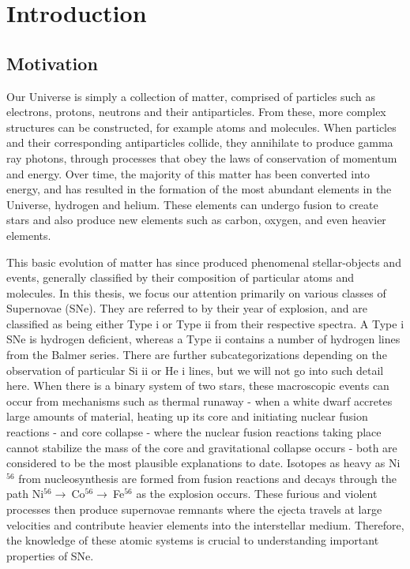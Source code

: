 
\chapter{Introduction} %

\label{cha:intro} %



\section{Motivation}\label{sec:int_motivation}
Our Universe is simply a collection of matter, comprised of particles such as electrons, protons, neutrons and their antiparticles. From these, more complex structures can be constructed, for example atoms and molecules. When particles and their corresponding antiparticles collide, they annihilate to produce gamma ray photons, through processes that obey the laws of conservation of momentum and energy. Over time, the majority of this matter has been converted into energy, and has resulted in the formation of the most abundant elements in the Universe, hydrogen and helium. These elements can undergo fusion to create stars and also produce new elements such as carbon, oxygen, and even heavier elements.

This basic evolution of matter has since produced phenomenal stellar-objects and events, generally classified by their composition of particular atoms and molecules. In this thesis, we focus our attention primarily on various classes of Supernovae (SNe). They are referred to by their year of explosion, and are classified as being either Type {\sc i} or Type {\sc ii} from their respective spectra. A Type {\sc i} SNe is hydrogen deficient, whereas a Type {\sc ii} contains a number of hydrogen lines from the Balmer series. There are further subcategorizations depending on the observation of particular Si {\sc ii} or He {\sc i} lines, but we will not go into such detail here. When there is a binary system of two stars, these macroscopic events can occur from mechanisms such as thermal runaway - when a white dwarf accretes large amounts of material, heating up its core and initiating nuclear fusion reactions - and core collapse - where the nuclear fusion reactions taking place cannot stabilize the mass of the core and gravitational collapse occurs - both are considered to be the most plausible explanations to date. Isotopes as heavy as Ni$^{56}$ from nucleosynthesis are formed from fusion reactions and decays through the path Ni$^{56} \rightarrow ~ $Co$^{56}\rightarrow~ $Fe$^{56}$ as the explosion occurs. These furious and violent processes then produce supernovae remnants where the ejecta travels at large velocities and contribute heavier elements into the interstellar medium. Therefore, the knowledge of these atomic systems is crucial to understanding important properties of SNe.

